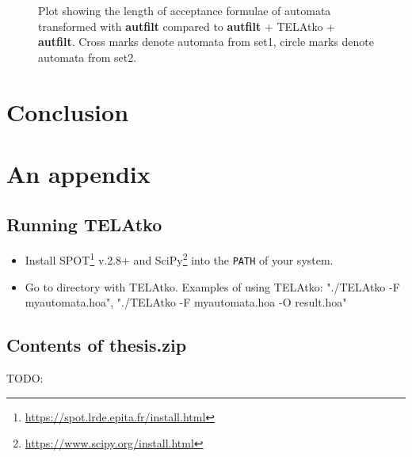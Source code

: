 \documentclass[
  digital, %
  twoside, %
  table,   %
  lof,     %
  lot,     %
]{fithesis3}
\begin{document}
\begin{figure}[h]
  \centering
    \begin{tikzpicture}
      
    \end{tikzpicture}
  \caption{Plot showing the length of acceptance formulae of automata transformed with \textbf{autfilt} compared to \textbf{autfilt} + TELAtko + \textbf{autfilt}. Cross marks denote automata from set1, circle marks denote automata from set2.}
  \label{fig:scplot_formula_len}
\end{figure}

\chapter{Conclusion}

\printbibliography[heading=bibintoc]

\makeatletter\thesis@blocks@clear\makeatother
{}
{} 
\printindex

\appendix
\chapter{An appendix}
\section{Running TELAtko}
\begin{itemize}
  \item Install SPOT\footnote{\url{https://spot.lrde.epita.fr/install.html}} v.2.8+ and SciPy\footnote{\url{https://www.scipy.org/install.html}} into the \texttt{PATH} of your system.
  \item Go to directory with TELAtko. Examples of using TELAtko: "./TELAtko -F myautomata.hoa", "./TELAtko -F myautomata.hoa -O result.hoa"
\end{itemize}
\section{Contents of thesis.zip}
TODO:
\end{document}
